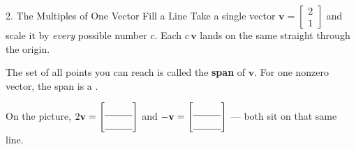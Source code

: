 \documentclass[10pt]{article}
\newcommand{\vv}{\mathbf{v}}
\begin{document}
\boxguard[20]
\begin{notesbox}{2. The Multiples of One Vector Fill a Line}
Take a single vector $\vv=\begin{bmatrix} 2 \\ 1 \end{bmatrix}$ and scale it by \emph{every}
possible number $c$. Each $c\,\vv$ lands on the same straight \blank{2.4cm} through the origin.

\vspace{2pt}
\begin{center}
\end{center}
The set of all points you can reach is called the \textbf{span} of $\vv$. For one nonzero
vector, the span is a \blank{2.4cm}.

\vspace{2pt}
On the picture, $2\vv=\begin{bmatrix}\rule{0pt}{1.1em}\blank{1.0cm}\\[2pt]\blank{1.0cm}\end{bmatrix}$
and $-\vv=\begin{bmatrix}\rule{0pt}{1.1em}\blank{1.0cm}\\[2pt]\blank{1.0cm}\end{bmatrix}$ --- both sit on that same line.
\end{notesbox}
\end{document}
